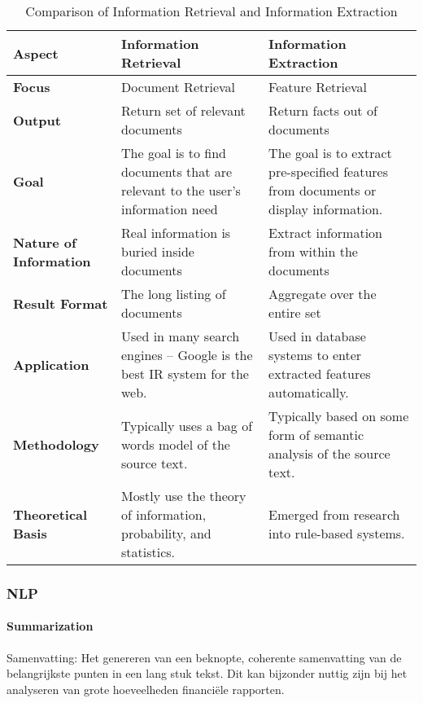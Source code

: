 \begin{table}[h!]
  \centering
  \begin{tabular}{|p{4cm}|p{5cm}|p{5cm}|}
  \hline
  \textbf{Aspect} & \textbf{Information Retrieval} & \textbf{Information Extraction} \\ \hline
  \textbf{Focus} & Document Retrieval & Feature Retrieval \\ \hline
  \textbf{Output} & Return set of relevant documents & Return facts out of documents \\ \hline
  \textbf{Goal} & The goal is to find documents that are relevant to the user’s information need & The goal is to extract pre-specified features from documents or display information. \\ \hline
  \textbf{Nature of Information} & Real information is buried inside documents & Extract information from within the documents \\ \hline
  \textbf{Result Format} & The long listing of documents & Aggregate over the entire set \\ \hline
  \textbf{Application} & Used in many search engines – Google is the best IR system for the web. & Used in database systems to enter extracted features automatically. \\ \hline
  \textbf{Methodology} & Typically uses a bag of words model of the source text. & Typically based on some form of semantic analysis of the source text. \\ \hline
  \textbf{Theoretical Basis} & Mostly use the theory of information, probability, and statistics. & Emerged from research into rule-based systems. \\ \hline
  \end{tabular}
  \caption{Comparison of Information Retrieval and Information Extraction}
  \label{tab:ir_vs_ie}
  \end{table}
  


\subsubsection{NLP}
\paragraph{Summarization}
Samenvatting: Het genereren van een beknopte, coherente samenvatting van de belangrijkste punten in een lang stuk tekst. Dit kan bijzonder nuttig zijn bij het analyseren van grote hoeveelheden financiële rapporten. 

